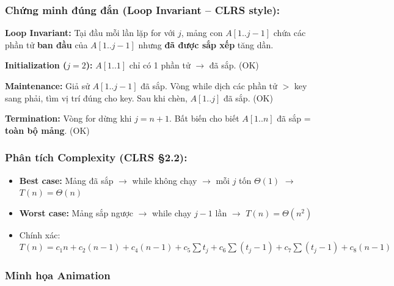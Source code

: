 \documentclass[10pt]{article}
\providecommand{\tightlist}{\setlength{\itemsep}{0pt}\setlength{\parskip}{0pt}}
\begin{document}
\subsubsection{Chứng minh đúng đắn (Loop Invariant -- CLRS
style):}\label{chux1ee9ng-minh-ux111uxfang-ux111ux1eafn-loop-invariant-clrs-style}

\textbf{Loop Invariant:} Tại đầu mỗi lần lặp for với \(j\), mảng con
\(A[1..j-1]\) chứa các phần tử \textbf{ban đầu} của \(A[1..j-1]\) nhưng
\textbf{đã được sắp xếp} tăng dần.

\textbf{Initialization (\(j=2\)):} \(A[1..1]\) chỉ có 1 phần tử \(\to\)
đã sắp. (OK)

\textbf{Maintenance:} Giả sử \(A[1..j-1]\) đã sắp. Vòng while dịch các
phần tử \(>\) key sang phải, tìm vị trí đúng cho key. Sau khi chèn,
\(A[1..j]\) đã sắp. (OK)

\textbf{Termination:} Vòng for dừng khi \(j = n+1\). Bất biến cho biết
\(A[1..n]\) đã sắp = \textbf{toàn bộ mảng}. (OK)

\subsubsection{\texorpdfstring{Phân tích Complexity (CLRS
\S 2.2):}{Phân tích Complexity (CLRS 2.2):}}\label{phuxe2n-tuxedch-complexity-clrs-2.2}

\begin{itemize}
\tightlist
\item
  \textbf{Best case:} Mảng đã sắp \(\to\) while không chạy \(\to\) mỗi
  \(j\) tốn \(\Theta(1)\) \(\to\) \(T(n) = \Theta(n)\)
\item
  \textbf{Worst case:} Mảng sắp ngược \(\to\) while chạy \(j-1\) lần
  \(\to\) \(T(n) = \Theta(n^2)\)
\item
  Chính xác:
  \(T(n) = c_1 n + c_2(n-1) + c_4(n-1) + c_5 \sum t_j + c_6 \sum (t_j - 1) + c_7 \sum (t_j - 1) + c_8(n-1)\)
\end{itemize}

\subsubsection{Minh họa Animation}
\end{document}
